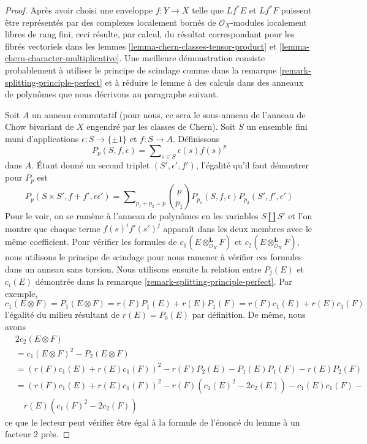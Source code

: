 \begin{proof}
Après avoir choisi une enveloppe $f : Y \to X$ telle que $Lf^*E$ et $Lf^*F$
puissent être représentés par des complexes localement bornés de
$\mathcal{O}_X$-modules localement libres de rang fini, ceci résulte, par calcul, du
résultat correspondant pour les fibrés vectoriels dans les
lemmes \ref{lemma-chern-classes-tensor-product} et
\ref{lemma-chern-character-multiplicative}.
Une meilleure démonstration consiste probablement à utiliser le principe de scindage comme dans la
remarque \ref{remark-splitting-principle-perfect}
et à réduire le lemme à des calculs dans des anneaux de polynômes 
que nous décrivons au paragraphe suivant.

\medskip\noindent
Soit $A$ un anneau commutatif (pour nous, ce sera le sous-anneau de l'anneau de Chow
bivariant de $X$ engendré par les classes de Chern).
Soit $S$ un ensemble fini muni d'applications $\epsilon : S \to \{\pm 1\}$
et $f : S \to A$. Définissons
$$
P_p(S, f , \epsilon) = \sum\nolimits_{s \in S} \epsilon(s) f(s)^p
$$
dans $A$. Étant donné un second triplet $(S', \epsilon', f')$,
l'égalité qu'il faut démontrer pour $P_p$ est
$$
P_p(S \times S', f + f' , \epsilon \epsilon') = 
\sum\nolimits_{p_1 + p_2 = p}
{p \choose p_1} P_{p_1}(S, f, \epsilon) P_{p_2}(S', f', \epsilon')
$$
Pour le voir, on se ramène à l'anneau de polynômes en les variables
$S \amalg S'$ et l'on montre que chaque terme $f(s)^if'(s')^j$ apparaît
dans les deux membres avec le même coefficient.
Pour vérifier les formules de $c_1(E \otimes_{\mathcal{O}_X}^\mathbf{L} F)$
et $c_2(E \otimes_{\mathcal{O}_X}^\mathbf{L} F)$, nous utilisons le principe de scindage
pour nous ramener à vérifier ces formules dans un anneau sans torsion.
Nous utilisons ensuite la relation entre $P_j(E)$ et $c_i(E)$ démontrée
dans la remarque \ref{remark-splitting-principle-perfect}. Par exemple,
$$
c_1(E \otimes F) = P_1(E \otimes F) = r(F)P_1(E) + r(E)P_1(F) =
r(F)c_1(E) + r(E)c_1(F)
$$
l'égalité du milieu résultant de $r(E) = P_0(E)$ par définition. De même, nous avons
\begin{align*}
& 2c_2(E \otimes F) \\
& = c_1(E \otimes F)^2 - P_2(E \otimes F) \\
& =
(r(F)c_1(E) + r(E)c_1(F))^2 -
r(F)P_2(E) - P_1(E)P_1(F) - r(E)P_2(F) \\
& =
(r(F)c_1(E) + r(E)c_1(F))^2 -
r(F)(c_1(E)^2 - 2c_2(E)) - c_1(E)c_1(F) - \\
& \quad r(E)(c_1(F)^2 - 2c_2(F))
\end{align*}
ce que le lecteur peut vérifier être égal à la formule de l'énoncé
du lemme à un facteur $2$ près.
\end{proof}







